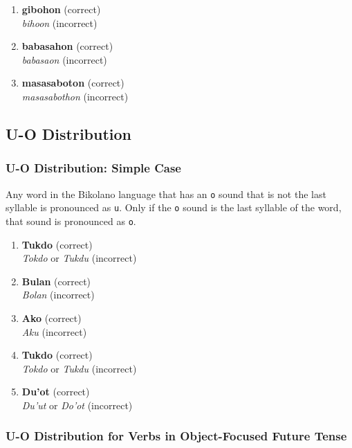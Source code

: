 \begin{enumerate}
      \item \textbf{gibohon} (correct) \\
            \textit{bihoon} (incorrect)
      \item \textbf{babasahon} (correct) \\
            \textit{babasaon} (incorrect)
      \item \textbf{masasaboton} (correct) \\
            \textit{masasabothon} (incorrect)
\end{enumerate}

\subsection{U-O Distribution}
\label{uo_distribution}
\subsubsection{U-O Distribution: Simple Case}
Any word in the Bikolano language that has an \texttt{o} sound that is not the last syllable is pronounced as \texttt{u}. Only if the \texttt{o} sound is the last syllable of the word, that sound is pronounced as \texttt{o}.

\begin{example}
\end{example}

\begin{enumerate}
      \item \textbf{Tukdo} (correct) \\
            \textit{Tokdo} or \textit{Tukdu} (incorrect) 
      \item \textbf{Bulan} (correct) \\
            \textit{Bolan} (incorrect) 
      \item \textbf{Ako} (correct) \\
            \textit{Aku} (incorrect) 
      \item \textbf{Tukdo} (correct) \\
            \textit{Tokdo} or \textit{Tukdu} (incorrect) 
      \item \textbf{Du'ot} (correct) \\
            \textit{Du'ut} or \textit{Do'ot} (incorrect) 
\end{enumerate}

\subsubsection{U-O Distribution for Verbs in Object-Focused Future Tense}

